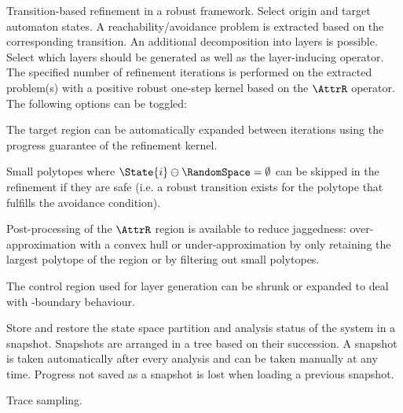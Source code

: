         Transition-based refinement in a robust framework.
        Select origin and target automaton states.
        A reachability/avoidance problem is extracted based on the corresponding transition.
        An additional decomposition into layers is possible.
        Select which layers should be generated as well as the layer-inducing operator.
        The specified number of refinement iterations is performed on the extracted problem(s) with a positive robust one-step kernel based on the $\AttrR$ operator.
        The following options can be toggled:

        \startitemize[packed]
            \item{The target region can be automatically expanded between iterations using the progress guarantee of the refinement kernel.}
            \item{Small polytopes where $\State{i} \ominus \RandomSpace = \emptyset$ can be skipped in the refinement if they are safe (i.e. a robust transition exists for the polytope that fulfills the avoidance condition).}
            \item{Post-processing of the $\AttrR$ region is available to reduce jaggedness: over-approximation with a convex hull or under-approximation by only retaining the largest polytope of the region or by filtering out small polytopes.}
            \item{The control region used for layer generation can be shrunk or expanded to deal with \epsilon-boundary behaviour.}
        \stopitemize

    \stopsubsubject

    \startsubsubject[title={Widget: Snapshots}]

        Store and restore the state space partition and analysis status of the system in a snapshot.
        Snapshots are arranged in a tree based on their succession.
        A snapshot is taken automatically after every analysis and can be taken manually at any time.
        Progress not saved as a snapshot is lost when loading a previous snapshot.

    \stopsubsubject

\stopsubject



\startsubject[title=Control Widgets]

    Trace sampling.

